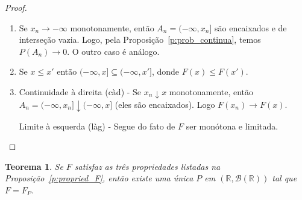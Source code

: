 \documentclass[reqno, draft]{book}
\newcommand*\1{\mathds{1}}
\newtheorem{theorem}{Teorema}[section]
\begin{document}
\begin{proof}
  \begin{enumerate}[\quad a)]
  \item Se $x_n \to -\infty$ monotonamente, então $A_n = (-\infty, x_n]$ são encaixados e de interseção vazia.
    Logo, pela Proposição~\ref{p:prob_continua}, temos $P(A_n) \to 0$.
    O outro caso é análogo.
  \item Se $x \leq x'$ então $(-\infty, x] \subseteq (-\infty,x']$, donde $F(x) \leq F(x')$.
  \item Continuidade à direita (càd) - Se $x_n \downarrow x$ monotonamente, então $A_n = (-\infty, x_n] \downarrow (-\infty, x]$ (eles são encaixados).
    Logo $F(x_n) \to F(x)$.

    Limite à esquerda (làg) - Segue do fato de $F$ ser monótona e limitada. \qedhere
  \end{enumerate}
\end{proof}

\begin{theorem}
  Se $F$ satisfaz as três propriedades listadas na Proposição~\ref{p:propried_F}, então existe uma única $P$ em $(\mathbb{R}, \mathcal{B}(\mathbb{R}))$ tal que $F = F_P$.
\end{theorem}
\end{document}
